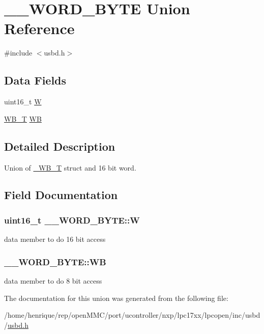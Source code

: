 \hypertarget{union____WORD__BYTE}{\section{\-\_\-\-\_\-\-W\-O\-R\-D\-\_\-\-B\-Y\-T\-E Union Reference}
\label{union____WORD__BYTE}
}


{\ttfamily \#include $<$usbd.\-h$>$}

\subsection*{Data Fields}
\begin{DoxyCompactItemize}
\item 
uint16\-\_\-t \hyperlink{union____WORD__BYTE_a90d5487c4190ce9c502f070f4a7a59e9}{W}
\item 
\hyperlink{group__USBD__Core_ga4fbe30f5ac133f5bb15c653a19162ae9}{W\-B\-\_\-\-T} \hyperlink{union____WORD__BYTE_a3ea700711d4333320b15562bbf2ab59c}{W\-B}
\end{DoxyCompactItemize}


\subsection{Detailed Description}
Union of \hyperlink{struct__WB__T}{\-\_\-\-W\-B\-\_\-\-T} struct and 16 bit word. 

\subsection{Field Documentation}
\hypertarget{union____WORD__BYTE_a90d5487c4190ce9c502f070f4a7a59e9}{
\subsubsection[{W}]{\setlength{\rightskip}{0pt plus 5cm}uint16\-\_\-t \-\_\-\-\_\-\-W\-O\-R\-D\-\_\-\-B\-Y\-T\-E\-::\-W}}\label{union____WORD__BYTE_a90d5487c4190ce9c502f070f4a7a59e9}
data member to do 16 bit access \hypertarget{union____WORD__BYTE_a3ea700711d4333320b15562bbf2ab59c}{
\subsubsection[{W\-B}]{ \-\_\-\-\_\-\-W\-O\-R\-D\-\_\-\-B\-Y\-T\-E\-::\-W\-B}}\label{union____WORD__BYTE_a3ea700711d4333320b15562bbf2ab59c}
data member to do 8 bit access 

The documentation for this union was generated from the following file\-:\begin{DoxyCompactItemize}
\item 
/home/henrique/rep/open\-M\-M\-C/port/ucontroller/nxp/lpc17xx/lpcopen/inc/usbd/\hyperlink{usbd_8h}{usbd.\-h}\end{DoxyCompactItemize}
